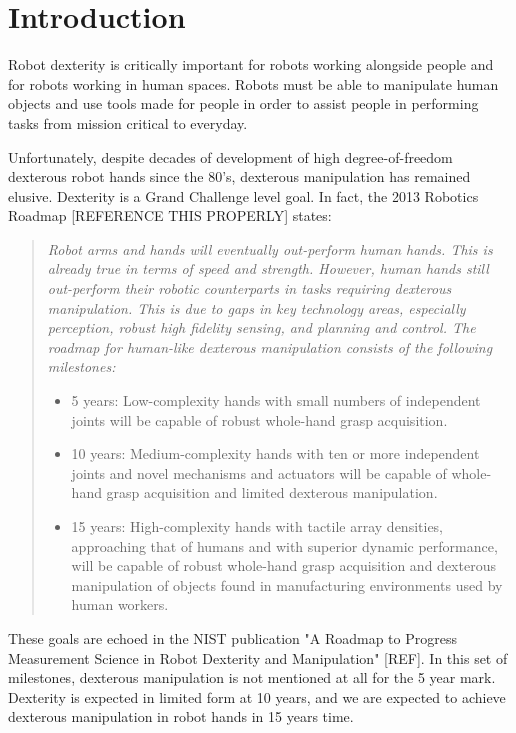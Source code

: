 \section{Introduction}

Robot dexterity is critically important for robots working alongside people and for robots working in human spaces.    Robots must be able to manipulate human objects and use tools made for people in order to assist people in performing tasks from mission critical to everyday.   

Unfortunately, despite decades of development of high degree-of-freedom dexterous robot hands since the 80's, dexterous manipulation has remained elusive.  Dexterity is a Grand Challenge level goal.   In fact, the 2013 Robotics Roadmap [REFERENCE THIS PROPERLY] states:
\begin{quotation}
{\small \it
Robot arms and hands will eventually out-perform human hands. This is already true in terms of speed and strength. However, human hands still out-perform their robotic counterparts in tasks requiring dexterous manipulation. This is due to gaps in key technology areas, especially perception, robust high fidelity sensing, and planning and control. The roadmap for human-like dexterous manipulation consists of the following milestones:
\begin{itemize}
	\item 5 years: Low-complexity hands with small numbers of independent joints will be capable of robust whole-hand grasp acquisition.
	\item 10 years: Medium-complexity hands with ten or more independent joints and novel mechanisms and actuators will be capable of whole-hand grasp acquisition and limited dexterous manipulation.
	\item 15 years: High-complexity hands with tactile array densities, approaching that of humans and with superior dynamic performance, will be capable of robust whole-hand grasp acquisition and dexterous manipulation of objects found in manufacturing environments used by human workers.
\end{itemize}}
\end{quotation}
These goals are echoed in the NIST publication "A Roadmap to Progress Measurement Science in Robot Dexterity and Manipulation" [REF].
In this set of milestones, dexterous manipulation is not mentioned at all for the 5 year mark.   Dexterity is expected in limited form at 10 years, and we are expected to achieve dexterous manipulation in robot hands in 15 years time.

